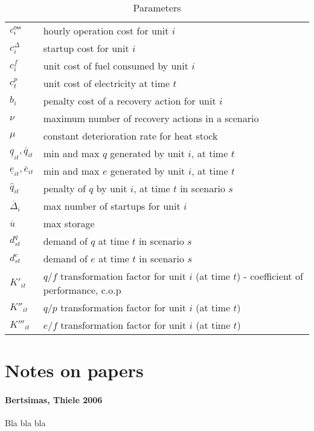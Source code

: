 \documentclass[a4paper,11pt,italian]{article}
\theoremstyle{changebreak}                %
\newcommand{\OM}{\mbox{\sf \tiny OM}}
\begin{document}
\begin{table}[h]
    \caption{Parameters}
\begin{tabular}{l l}
    $c_{i}^{\OM}$ & hourly operation cost for unit $i$ \\
    $c_{i}^{\Delta}$ & startup cost for unit $i$ \\
    $c_{i}^{f}$ & unit cost of fuel consumed by unit $i$ \\
    $c_t^{p}$ & unit cost of electricity at time $t$ \\
    $b_{i}$ & penalty cost of a recovery action for unit $i$\\
    $\nu$ & maximum number of recovery actions in a scenario\\
    $\mu$ & constant deterioration rate for heat stock \\
    $\underline{q}_{it},\overline{q}_{it}$ & min and max $q$ generated by unit $i$, at time $t$\\
    $\underline{e}_{it},\overline{e}_{it}$ & min and max $e$ generated by unit $i$, at time $t$\\
    $\hat{q}_{it}$ & penalty of $q$  by unit $i$, at time $t$ in scenario $s$\\
    $\overline{\Delta}_i$ & max number of startups for unit $i$\\
    $\overline{u}$ & max storage\\
    $d^q_{st}$ & demand of $q$ at time $t$ in scenario $s$\\
    $d^e_{st}$ & demand of $e$ at time $t$ in scenario $s$\\
    $K'_{it}$ & $q/f$ transformation factor for unit $i$ (at time $t$) - coefficient of performance, c.o.p\\
    $K''_{it}$ & $q/p$ transformation factor for unit $i$ (at time $t$)\\
    $K'''_{it}$ & $e/f$ transformation factor for unit $i$ (at time $t$)\\
\end{tabular}
\end{table}

\section{Notes on papers}
\paragraph{Bertsimas, Thiele 2006}
Bla bla bla
\end{document}
